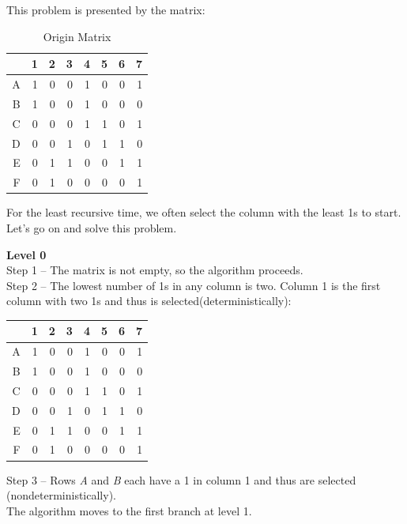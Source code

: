 \documentclass{mcmthesis}
\begin{document}
This problem is presented by the matrix:
\begin{table}[ht]
\centering
	\begin{tabular}{|r|r|r|r|r|r|r|r|}
		\hline
		     & 1 & 2 & 3 & 4 & 5 & 6 & 7\\
		     \hline
		   A & 1 & 0 & 0 & 1 & 0 & 0 & 1\\
		     \hline
		   B & 1 & 0 & 0 & 1 & 0 & 0 & 0\\
		     \hline
		   C & 0 & 0 & 0 & 1 & 1 & 0 & 1\\
		     \hline
		   D & 0 & 0 & 1 & 0 & 1 & 1 & 0\\
		     \hline
		   E & 0 & 1 & 1 & 0 & 0 & 1 & 1\\
		     \hline
		   F & 0 & 1 & 0 & 0 & 0 & 0 & 1\\
		\hline
	\end{tabular}
\caption{Origin Matrix}
\end{table}

For the least recursive time, we often select the column with the least 1s to start. Let's go on and solve this problem. 

\textbf{Level 0}\\
\indent Step 1 -- The matrix is not empty, so the algorithm proceeds. \\
\indent Step 2 -- The lowest number of 1s in any column is two. Column 1 is the first column with two 1s and thus is selected(deterministically):

\begin{table}[ht]
\centering
	\begin{tabular}{|r|r|r|r|r|r|r|r|}
		\hline
		     & 1 & 2 & 3 & 4 & 5 & 6 & 7\\
		     \hline
		   A & \textcolor[rgb]{0.98,0.00,0.00}1 & 0 & 0 & 1 & 0 & 0 & 1\\
		     \hline
		   B & \textcolor[rgb]{0.98,0.00,0.00}1 & 0 & 0 & 1 & 0 & 0 & 0\\
		     \hline
		   C & 0 & 0 & 0 & 1 & 1 & 0 & 1\\
		     \hline
		   D & 0 & 0 & 1 & 0 & 1 & 1 & 0\\
		     \hline
		   E & 0 & 1 & 1 & 0 & 0 & 1 & 1\\
		     \hline
		   F & 0 & 1 & 0 & 0 & 0 & 0 & 1\\
		\hline
	\end{tabular}
\end{table}

\indent Step 3 -- Rows \textit{A} and \textit{B} each have a 1 in column 1 and thus are selected (nondeterministically).\\
The algorithm moves to the first branch at level 1.
\end{document}
